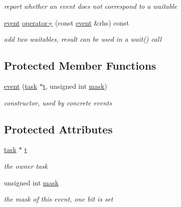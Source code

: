 \begin{DoxyCompactItemize}
\begin{DoxyCompactList}\small\item\em report whether an event does not correspond to a waitable \end{DoxyCompactList}\item 
\hyperlink{class_r_t_o_s_1_1event}{event} \hyperlink{class_r_t_o_s_1_1event_addfcf242018d11a0f35f510d17683697}{operator+} (const \hyperlink{class_r_t_o_s_1_1event}{event} \&rhs) const 
\begin{DoxyCompactList}\small\item\em add two waitables, result can be used in a wait() call \end{DoxyCompactList}\end{DoxyCompactItemize}
\subsection*{Protected Member Functions}
\begin{DoxyCompactItemize}
\item 
\hyperlink{class_r_t_o_s_1_1event_a00cf9d5d01e670e2b358c2a4c7578e7d}{event} (\hyperlink{class_r_t_o_s_1_1task}{task} $\ast$\hyperlink{class_r_t_o_s_1_1event_a1402687edb26c1d5d26e54dbda21919d}{t}, unsigned int \hyperlink{class_r_t_o_s_1_1event_a74f6161d8c82d461ae3ba29f0e222b59}{mask})\hypertarget{class_r_t_o_s_1_1event_a00cf9d5d01e670e2b358c2a4c7578e7d}{}\label{class_r_t_o_s_1_1event_a00cf9d5d01e670e2b358c2a4c7578e7d}

\begin{DoxyCompactList}\small\item\em constructor, used by concrete events \end{DoxyCompactList}\end{DoxyCompactItemize}
\subsection*{Protected Attributes}
\begin{DoxyCompactItemize}
\item 
\hyperlink{class_r_t_o_s_1_1task}{task} $\ast$ \hyperlink{class_r_t_o_s_1_1event_a1402687edb26c1d5d26e54dbda21919d}{t}\hypertarget{class_r_t_o_s_1_1event_a1402687edb26c1d5d26e54dbda21919d}{}\label{class_r_t_o_s_1_1event_a1402687edb26c1d5d26e54dbda21919d}

\begin{DoxyCompactList}\small\item\em the owner task \end{DoxyCompactList}\item 
unsigned int \hyperlink{class_r_t_o_s_1_1event_a74f6161d8c82d461ae3ba29f0e222b59}{mask}
\begin{DoxyCompactList}\small\item\em the mask of this event, one bit is set \end{DoxyCompactList}\end{DoxyCompactItemize}
